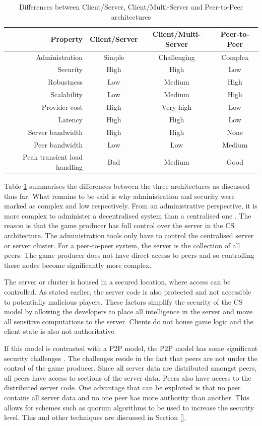\documentclass[journal,oneside,a4paper,onecolumn]{IEEEtran}
\begin{document}
\begin{table}[htbp]
\centering
\begin{tabular}{|r|c|c|c|}
\hline
Property & Client/Server & Client/Multi-Server & Peer-to-Peer\\
\hline
Administration & Simple & Challenging & Complex\\
Security & High & High & Low\\
Robustness & Low & Medium & High\\
Scalability & Low & Medium & High\\
Provider cost & High & Very high & Low\\
Latency & High & High & Low\\
Server bandwidth & High & High & None\\
Peer bandwidth & Low & Low & Medium\\
Peak transient load handling & Bad & Medium & Good\\
\hline
\end{tabular}
\caption{Differences between Client/Server, Client/Multi-Server and Peer-to-Peer architectures}
\label{tab_archs}
\end{table}

Table \ref{tab_archs} summarises the differences between the three architectures as discussed thus far. What remains to be said is why administration and security were marked as complex and low respectively. From an administrative perspective, it is more complex to administer a decentralised system than a centralised one \cite{}. The reason is that the game producer has full control over the server in the \ac{CS} architecture. The administration tools only have to control the centralised server or server cluster. For a peer-to-peer system, the server is the collection of all peers. The game producer does not have direct access to peers and so controlling these nodes become significantly more complex.

The server or cluster is housed in a secured location, where access can be controlled. As stated earlier, the server code is also protected and not accessible to potentially malicious players. These factors simplify the security of the \ac{CS} model by allowing the developers to place all intelligence in the server and move all sensitive computations to the server. Clients do not house game logic and the client state is also not authoritative.

If this model is contrasted with a P2P model, the P2P model has some significant security challenges \cite{}. The challenges reside in the fact that peers are not under the control of the game producer. Since all server data are distributed amongst peers, all peers have access to sections of the server data. Peers also have access to the distributed server code. One advantage that can be exploited is that no peer contains all server data and no one peer has more authority than another. This allows for schemes such as quorum algorithms to be used to increase the security level. This and other techniques are discussed in Section \ref{}.
\end{document}
